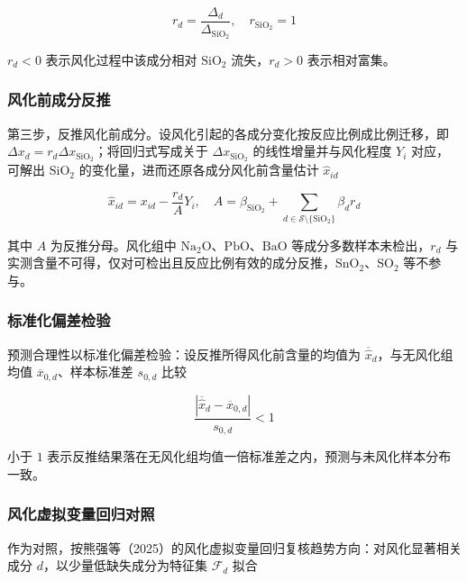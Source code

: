 \documentclass{ctexart}
\begin{document}
\begin{equation*}
r_{d}=\frac{\Delta_{d}}{\Delta_{\mathrm{SiO_2}}},\quad r_{\mathrm{SiO_2}}=1
\end{equation*}

$r_{d}<0$ 表示风化过程中该成分相对 $\mathrm{SiO_2}$ 流失，$r_{d}>0$ 表示相对富集。


\subsubsection{风化前成分反推}

第三步，反推风化前成分。设风化引起的各成分变化按反应比例成比例迁移，即 $\Delta x_{d}=r_{d}\Delta x_{\mathrm{SiO_2}}$；将回归式写成关于 $\Delta x_{\mathrm{SiO_2}}$ 的线性增量并与风化程度 $Y_i$ 对应，可解出 $\mathrm{SiO_2}$ 的变化量，进而还原各成分风化前含量估计 $\widehat{x}_{id}$

\begin{equation*}
\widehat{x}_{id}=x_{id}-\frac{r_{d}}{A}Y_i,\quad A=\beta_{\mathrm{SiO_2}}+\sum_{d\in\mathcal{S}\setminus\{\mathrm{SiO_2}\}}\beta_{d}r_{d}
\end{equation*}

其中 $A$ 为反推分母。风化组中 $\mathrm{Na_2O}$、$\mathrm{PbO}$、$\mathrm{BaO}$ 等成分多数样本未检出，$r_d$ 与实测含量不可得，仅对可检出且反应比例有效的成分反推，$\mathrm{SnO_2}$、$\mathrm{SO_2}$ 等不参与。


\subsubsection{标准化偏差检验}

预测合理性以标准化偏差检验：设反推所得风化前含量的均值为 $\overline{\widehat{x}}_{d}$，与无风化组均值 $\overline{x}_{0,d}$、样本标准差 $s_{0,d}$ 比较

\begin{equation*}
\frac{|\overline{\widehat{x}}_{d}-\overline{x}_{0,d}|}{s_{0,d}}<1
\end{equation*}

小于 $1$ 表示反推结果落在无风化组均值一倍标准差之内，预测与未风化样本分布一致。


\subsubsection{风化虚拟变量回归对照}

作为对照，按熊强等（2025）的风化虚拟变量回归复核趋势方向：对风化显著相关成分 $d$，以少量低缺失成分为特征集 $\mathcal{F}_d$ 拟合
\end{document}
